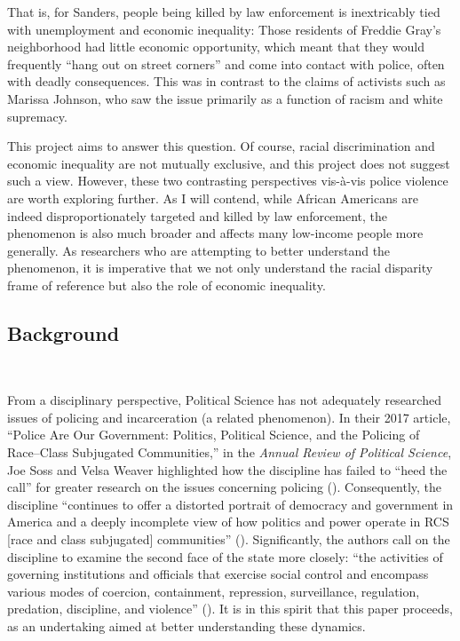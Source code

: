 \documentclass[12pt]{article}
\begin{document}
That is, for Sanders, people being killed by law enforcement is inextricably tied with unemployment and economic inequality: Those residents of Freddie Gray's neighborhood had little economic opportunity, which meant that they would frequently “hang out on street corners” and come into contact with police, often with deadly consequences. This was in contrast to the claims of activists such as Marissa Johnson, who saw the issue primarily as a function of racism and white supremacy.

This project aims to answer this question. Of course, racial discrimination and economic inequality are not mutually exclusive, and this project does not suggest such a view. However, these two contrasting perspectives vis-à-vis police violence are worth exploring further. As I will contend, while African Americans are indeed disproportionately targeted and killed by law enforcement, the phenomenon is also much broader and affects many low-income people more generally. As researchers who are attempting to better understand the phenomenon, it is imperative that we not only understand the racial disparity frame of reference but also the role of economic inequality.

\subsection{Background}\

From a disciplinary perspective, Political Science has not adequately researched issues of policing and incarceration (a related phenomenon). In their 2017 article, “Police Are Our Government: Politics, Political Science, and the Policing of Race–Class Subjugated Communities,” in the \textit{Annual Review of Political Science}, Joe Soss and Velsa Weaver highlighted how the discipline has failed to “heed the call” for greater research on the issues concerning policing (\citeyear[568]{sossPoliceAreOur2017}). Consequently, the discipline “continues to offer a distorted portrait of democracy and government in America and a deeply incomplete view of how politics and power operate in RCS [race and class subjugated] communities” (\cite[568]{sossPoliceAreOur2017}). Significantly, the authors call on the discipline to examine the second face of the state more closely: ``the activities of governing institutions and officials that exercise social control and encompass various modes of coercion, containment, repression, surveillance, regulation, predation, discipline, and violence” (\cite[567]{sossPoliceAreOur2017}). It is in this spirit that this paper proceeds, as an undertaking aimed at better understanding these dynamics.
\end{document}
